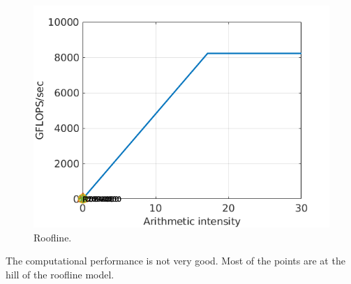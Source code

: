 \documentclass{amsart} %
\begin{document}
\begin{figure}
	\includegraphics[width=\linewidth]{roofline.png}
	\caption{Roofline.}
	\label{fig:roofline model}
	\end{figure}


The computational performance is not very good. Most of the points are at the hill of the roofline model.
 

\end{document}
